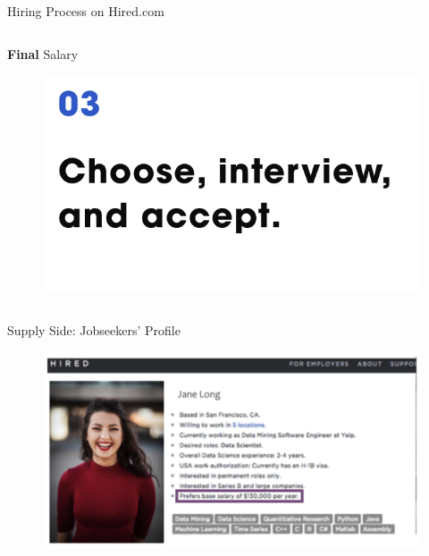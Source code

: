 \begin{frame}{Hiring Process on Hired.com}
\begin{columns}[T]
        \begin{column}{0.3\textwidth}
            \begin{block}{\small \centering \textbf{Final} Salary}
                \begin{figure}
                    \centering
                    \includegraphics[width = 0.95 \textwidth]{images/hireprocess3.png}
                \end{figure}
            \end{block}
        \end{column}
    \end{columns}
\end{frame}

\begin{frame}{Supply Side: Jobseekers' Profile}
    \begin{figure}
        \centering
        \includegraphics[height = 0.75 \textheight]{images/jobseeker.png}
    \end{figure}
\end{frame}

